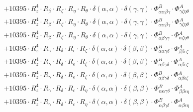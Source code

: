 \documentclass{article}
\begin{document}
\begin{subequations}
\begin{gather}
\begin{array}{c}
 \\[0.2em] 		 + 10395 \cdot R_{z}^{4} \cdot R_{\beta{}} \cdot R_{\zeta{}} \cdot R_{\eta{}} \cdot R_{\theta{}} \cdot \delta{}\left(\alpha{}, \alpha{}\right) \cdot \delta{}\left(\gamma{}, \gamma{}\right) \cdot \Phi{}^{B}_{\alpha{}\alpha{}\beta{}\gamma{}} \cdot \Phi{}^{A}_{\gamma{}\zeta{}\eta{}\theta{}} 
 \\[0.2em] 		 + 10395 \cdot R_{z}^{4} \cdot R_{\beta{}} \cdot R_{\zeta{}} \cdot R_{\eta{}} \cdot R_{\theta{}} \cdot \delta{}\left(\alpha{}, \alpha{}\right) \cdot \delta{}\left(\gamma{}, \gamma{}\right) \cdot \Phi{}^{B}_{\alpha{}\alpha{}\beta{}\gamma{}} \cdot \Phi{}^{A}_{\gamma{}\zeta{}\eta{}\theta{}} 
 \\[0.2em] 		 + 10395 \cdot R_{z}^{4} \cdot R_{\beta{}} \cdot R_{\zeta{}} \cdot R_{\eta{}} \cdot R_{\theta{}} \cdot \delta{}\left(\alpha{}, \alpha{}\right) \cdot \delta{}\left(\gamma{}, \gamma{}\right) \cdot \Phi{}^{B}_{\alpha{}\beta{}\gamma{}\gamma{}} \cdot \Phi{}^{A}_{\alpha{}\zeta{}\eta{}\theta{}} 
 \\[0.2em] 		 + 10395 \cdot R_{z}^{4} \cdot R_{\gamma{}} \cdot R_{\delta{}} \cdot R_{\epsilon{}} \cdot R_{\zeta{}} \cdot \delta{}\left(\alpha{}, \alpha{}\right) \cdot \delta{}\left(\beta{}, \beta{}\right) \cdot \Phi{}^{B}_{\alpha{}\alpha{}\gamma{}\delta{}} \cdot \Phi{}^{A}_{\beta{}\beta{}\epsilon{}\zeta{}} 
 \\[0.2em] 		 + 10395 \cdot R_{z}^{4} \cdot R_{\gamma{}} \cdot R_{\delta{}} \cdot R_{\epsilon{}} \cdot R_{\zeta{}} \cdot \delta{}\left(\alpha{}, \alpha{}\right) \cdot \delta{}\left(\beta{}, \beta{}\right) \cdot \Phi{}^{B}_{\alpha{}\beta{}\gamma{}\delta{}} \cdot \Phi{}^{A}_{\alpha{}\beta{}\epsilon{}\zeta{}} 
 \\[0.2em] 		 + 10395 \cdot R_{z}^{4} \cdot R_{\gamma{}} \cdot R_{\delta{}} \cdot R_{\epsilon{}} \cdot R_{\zeta{}} \cdot \delta{}\left(\alpha{}, \alpha{}\right) \cdot \delta{}\left(\beta{}, \beta{}\right) \cdot \Phi{}^{B}_{\alpha{}\beta{}\gamma{}\delta{}} \cdot \Phi{}^{A}_{\alpha{}\beta{}\epsilon{}\zeta{}} 
 \\[0.2em] 		 + 10395 \cdot R_{z}^{4} \cdot R_{\gamma{}} \cdot R_{\delta{}} \cdot R_{\epsilon{}} \cdot R_{\eta{}} \cdot \delta{}\left(\alpha{}, \alpha{}\right) \cdot \delta{}\left(\beta{}, \beta{}\right) \cdot \Phi{}^{B}_{\alpha{}\alpha{}\gamma{}\delta{}} \cdot \Phi{}^{A}_{\beta{}\beta{}\epsilon{}\eta{}} 
 \\[0.2em] 		 + 10395 \cdot R_{z}^{4} \cdot R_{\gamma{}} \cdot R_{\delta{}} \cdot R_{\epsilon{}} \cdot R_{\eta{}} \cdot \delta{}\left(\alpha{}, \alpha{}\right) \cdot \delta{}\left(\beta{}, \beta{}\right) \cdot \Phi{}^{B}_{\alpha{}\beta{}\gamma{}\delta{}} \cdot \Phi{}^{A}_{\alpha{}\beta{}\epsilon{}\eta{}} 

\end{array}
\end{gather}
\end{subequations}
\end{document}
